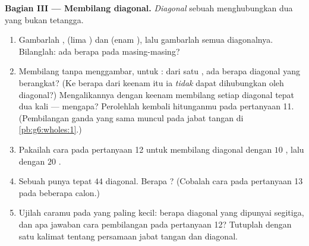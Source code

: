 \begin{problem}
\medskip
\noindent\textbf{Bagian III --- Membilang diagonal.}
\emph{Diagonal} sebuah  menghubungkan dua  yang
bukan tetangga.
\begin{enumerate}[resume]
  \item Gambarlah ,  (lima ) dan  (enam ), lalu gambarlah semua diagonalnya.
        Bilanglah: ada berapa pada masing-masing?
  \item Membilang tanpa menggambar, untuk : dari satu , ada berapa diagonal yang berangkat? (Ke berapa dari
        keenam  itu ia \emph{tidak} dapat dihubungkan oleh
        diagonal?) Mengalikannya dengan keenam  membilang
        setiap diagonal tepat dua kali --- mengapa? Perolehlah
        kembali hitunganmu pada pertanyaan 11. (Pembilangan ganda
        yang sama muncul pada jabat tangan di \cref{pb:g6:wholes:1}.)
  \item Pakailah cara pada pertanyaan 12 untuk membilang diagonal
         dengan $10$ , lalu dengan $20$ .
  \item Sebuah  punya tepat $44$ diagonal. Berapa ? (Cobalah cara pada pertanyaan 13 pada beberapa
        calon.)
  \item Ujilah caramu pada  yang paling kecil: berapa
        diagonal yang dipunyai segitiga, dan apa jawaban cara
        pembilangan pada pertanyaan 12? Tutuplah dengan satu kalimat
        tentang persamaan jabat tangan dan diagonal.

\end{enumerate}
\end{problem}
